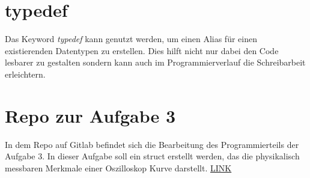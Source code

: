 \section{typedef}
Das Keyword \textit{typedef} kann genutzt werden, um einen Alias für einen existierenden Datentypen zu erstellen. Dies hilft nicht nur dabei den Code lesbarer zu gestalten sondern kann auch im Programmierverlauf die Schreibarbeit erleichtern.

\section{Repo zur Aufgabe 3}
In dem Repo auf Gitlab befindet sich die Bearbeitung des Programmierteils der Aufgabe 3. 
In dieser Aufgabe soll ein struct erstellt werden, das die physikalisch messbaren Merkmale einer Oszilloskop Kurve darstellt.
\href{https://gitlab.thga.de/daniel.krueger/pruefung_sose_2023_aufgabe_3_struct}{LINK} 

